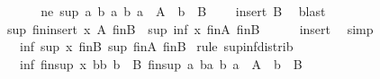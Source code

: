 \begin{isabellebody}
\ \ \isamarkupfalse%
\isanewline
\ \ \isamarkupfalse%
\ ne{\isacharcolon}{\kern0pt}\ {\isachardoublequoteopen}{\isacharbraceleft}{\kern0pt}sup\ a\ b\ {\isacharbar}{\kern0pt}a\ b{\isachardot}{\kern0pt}\ a\ {\isasymin}\ A\ {\isasymand}\ b\ {\isasymin}\ B{\isacharbraceright}{\kern0pt}\ {\isasymnoteq}\ {\isacharbraceleft}{\kern0pt}{\isacharbraceright}{\kern0pt}{\isachardoublequoteclose}\ \isamarkupfalse%
\ insert\ B\ \isamarkupfalse%
\ blast\isanewline
\ \ \isamarkupfalse%
\ {\isachardoublequoteopen}sup\ {\isacharparenleft}{\kern0pt}{\isasymSqinter}\isactrlsub f\isactrlsub i\isactrlsub n{\isacharparenleft}{\kern0pt}insert\ x\ A{\isacharparenright}{\kern0pt}{\isacharparenright}{\kern0pt}\ {\isacharparenleft}{\kern0pt}{\isasymSqinter}\isactrlsub f\isactrlsub i\isactrlsub nB{\isacharparenright}{\kern0pt}\ {\isacharequal}{\kern0pt}\ sup\ {\isacharparenleft}{\kern0pt}inf\ x\ {\isacharparenleft}{\kern0pt}{\isasymSqinter}\isactrlsub f\isactrlsub i\isactrlsub nA{\isacharparenright}{\kern0pt}{\isacharparenright}{\kern0pt}\ {\isacharparenleft}{\kern0pt}{\isasymSqinter}\isactrlsub f\isactrlsub i\isactrlsub nB{\isacharparenright}{\kern0pt}{\isachardoublequoteclose}\isanewline
\ \ \ \ \isamarkupfalse%
\ insert\ \isamarkupfalse%
\ simp\isanewline
\ \ \isamarkupfalse%
\ \isamarkupfalse%
\ {\isachardoublequoteopen}{\isasymdots}\ {\isacharequal}{\kern0pt}\ inf\ {\isacharparenleft}{\kern0pt}sup\ x\ {\isacharparenleft}{\kern0pt}{\isasymSqinter}\isactrlsub f\isactrlsub i\isactrlsub nB{\isacharparenright}{\kern0pt}{\isacharparenright}{\kern0pt}\ {\isacharparenleft}{\kern0pt}sup\ {\isacharparenleft}{\kern0pt}{\isasymSqinter}\isactrlsub f\isactrlsub i\isactrlsub nA{\isacharparenright}{\kern0pt}\ {\isacharparenleft}{\kern0pt}{\isasymSqinter}\isactrlsub f\isactrlsub i\isactrlsub nB{\isacharparenright}{\kern0pt}{\isacharparenright}{\kern0pt}{\isachardoublequoteclose}\ \isamarkupfalse%
{\isacharparenleft}{\kern0pt}rule\ sup{\isacharunderscore}{\kern0pt}inf{\isacharunderscore}{\kern0pt}distrib{}{\isacharparenright}{\kern0pt}\isanewline
\ \ \isamarkupfalse%
\ \isamarkupfalse%
\ {\isachardoublequoteopen}{\isasymdots}\ {\isacharequal}{\kern0pt}\ inf\ {\isacharparenleft}{\kern0pt}{\isasymSqinter}\isactrlsub f\isactrlsub i\isactrlsub n{\isacharbraceleft}{\kern0pt}sup\ x\ b{\isacharbar}{\kern0pt}b{\isachardot}{\kern0pt}\ b\ {\isasymin}\ B{\isacharbraceright}{\kern0pt}{\isacharparenright}{\kern0pt}\ {\isacharparenleft}{\kern0pt}{\isasymSqinter}\isactrlsub f\isactrlsub i\isactrlsub n{\isacharbraceleft}{\kern0pt}sup\ a\ b{\isacharbar}{\kern0pt}a\ b{\isachardot}{\kern0pt}\ a\ {\isasymin}\ A\ {\isasymand}\ b\ {\isasymin}\ B{\isacharbraceright}{\kern0pt}{\isacharparenright}{\kern0pt}{\isachardoublequoteclose}\isanewline

\end{isabellebody}
